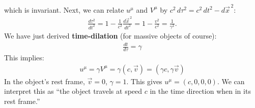 \documentclass{article}
\theoremstyle{definition}
\begin{document}
which is invariant. Next, we can relate $u^\mu$ and $V^\mu$ by $c^2\,d\tau^2 = c^2\,dt^2 - d\vec{x}^{\,2}$:
\begin{align*}
\frac{d\tau^2}{dt^2} = 1 - \frac{1}{c^2}\frac{d\vec{x}^{\,2}}{dt^2} = 1 - \frac{v^2}{c^2}  = \frac{1}{\gamma^2}.
\end{align*}
We have just derived \textbf{time-dilation} (for massive objects of course):
\begin{align*}
\boxed{\frac{dt}{d\tau} = \gamma}
\end{align*}
This implies:
\begin{align*}
\boxed{u^\mu = \gamma V^\mu = \gamma(c,\vec{v}) = (\gamma c, \gamma\vec{v})}
\end{align*}
In the object's rest frame, $\vec{v} = 0$, $\gamma = 1$. This gives $u^\mu = (c,0,0,0)$. We can interpret this as ``the object travels at speed $c$ in the time direction when in its rest frame.''\\
\end{document}

